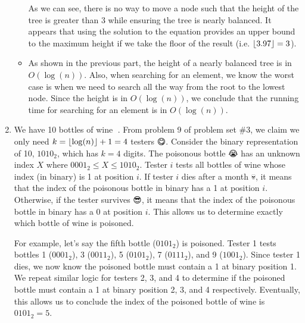 \documentclass[11pt, letterpaper, titlepage]{article}
\DeclarePairedDelimiter\floor{\lfloor}{\rfloor}
\begin{document}
\begin{enumerate}[label=\alph*)]
\begin{itemize}
        \begin{figure}[H]
        \centering
        \end{figure}

        As we can see, there is no way to move a node such that the height of the tree is greater than 3 while ensuring the tree is nearly balanced. It appears that using the solution to the equation provides an upper bound to the maximum height if we take the floor of the result (i.e. $\floor*{3.97} = 3$).
        
        \item As shown in the previous part, the height of a nearly balanced tree is in $O(\log(n))$. Also, when searching for an element, we know the worst case is when we need to search all the way from the root to the lowest node. Since the height is in $O(\log(n))$, we conclude that the running time for searching for an element is in $O(\log(n))$.
    \end{itemize}

    \item We have 10 bottles of wine 🍷. From problem 9 of problem set \#3, we claim we only need $k = \floor*{\log(n)} + 1 = 4$ testers 😋. Consider the binary representation of 10, $1010_2$, which has $k = 4$ digits. The poisonous bottle 😭 has an unknown index $X$ where $0001_2 \leq X \leq 1010_2$. Tester $i$ tests all bottles of wine whose index (in binary) is 1 at position $i$. If tester $i$ dies after a month 💀, it means that the index of the poisonous bottle in binary has a 1 at position $i$. Otherwise, if the tester survives 😎, it means that the index of the poisonous bottle in binary has a 0 at position $i$. This allows us to determine exactly which bottle of wine is poisoned.
    
    For example, let's say the fifth bottle ($0101_2$) is poisoned. Tester 1 tests bottles 1 ($0001_2$), 3 ($0011_2$), 5 ($0101_2$), 7 ($0111_2$), and 9 ($1001_2$). Since tester 1 dies, we now know the poisoned bottle must contain a 1 at binary position 1. We repeat similar logic for testers 2, 3, and 4 to determine if the poisoned bottle must contain a 1 at binary position 2, 3, and 4 respectively. Eventually, this allows us to conclude the index of the poisoned bottle of wine is $0101_2 = 5$. 
\end{enumerate}
\end{document}

